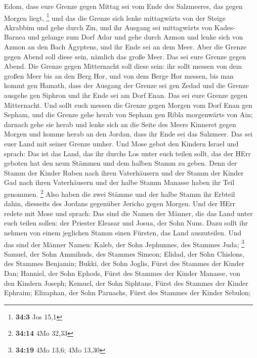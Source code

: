 Edom, dass eure Grenze gegen Mittag sei vom Ende des Salzmeeres, das
gegen Morgen liegt, \footnote{\textbf{34:3} Jos 15,1}  und
das die Grenze sich lenke mittagwärts von der Steige Akrabbim und gehe
durch Zin, und ihr Ausgang sei mittagwärts von Kades-Barnea und gelange
zum Dorf Adar und gehe durch Azmon  und lenke sich von Azmon
an den Bach Ägyptens, und ihr Ende sei an dem Meer.  Aber
die Grenze gegen Abend soll diese sein, nämlich das große Meer. Das sei
eure Grenze gegen Abend.  Die Grenze gegen Mitternacht soll
diese sein: ihr sollt messen von dem großen Meer bis an den Berg Hor,
 und von dem Berge Hor messen, bis man kommt gen Hamath,
dass der Ausgang der Grenze sei gen Zedad  und die Grenze
ausgehe gen Siphron und ihr Ende sei am Dorf Enan. Das sei eure Grenze
gegen Mitternacht.  Und sollt euch messen die Grenze gegen
Morgen vom Dorf Enan gen Sepham,  und die Grenze gehe herab
von Sepham gen Ribla morgenwärts von Ain; darnach gehe sie herab und
lenke sich an die Seite des Meers Kinneret gegen Morgen 
und komme herab an den Jordan, dass ihr Ende sei das Salzmeer. Das sei
euer Land mit seiner Grenze umher.  Und Mose gebot den
Kindern Israel und sprach: Das ist das Land, das ihr durchs Los unter
euch teilen sollt, das der HErr geboten hat den neun Stämmen und dem
halben Stamm zu geben.  Denn der Stamm der Kinder Ruben
nach ihren Vaterhäusern und der Stamm der Kinder Gad nach ihren
Vaterhäusern und der halbe Stamm Manasse haben ihr Teil genommen.
\footnote{\textbf{34:14} 4Mo 32,33}  Also haben die zwei
Stämme und der halbe Stamm ihr Erbteil dahin, diesseits des Jordans
gegenüber Jericho gegen Morgen.  Und der HErr redete mit
Mose und sprach:  Das sind die Namen der Männer, die das
Land unter euch teilen sollen: der Priester Eleasar und Josua, der Sohn
Nuns.  Dazu sollt ihr nehmen von einem jeglichen Stamm
einen Fürsten, das Land auszuteilen.  Und das sind der
Männer Namen: Kaleb, der Sohn Jephunnes, des Stammes Juda; \footnote{\textbf{34:19}
  4Mo 13,6; 4Mo 13,30}  Samuel, der Sohn Ammihuds, des
Stammes Simeon;  Elidad, der Sohn Chislons, des Stammes
Benjamin;  Bukki, der Sohn Joglis, Fürst des Stammes der
Kinder Dan;  Hanniel, der Sohn Ephods, Fürst des Stammes
der Kinder Manasse, von den Kindern Joseph;  Kemuel, der
Sohn Siphtans, Fürst des Stammes der Kinder Ephraim; 
Elizaphan, der Sohn Parnachs, Fürst des Stammes der Kinder Sebulon;
